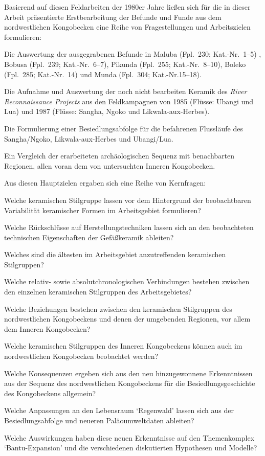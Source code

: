 \vspace{1.5em}
\noindent Basierend auf diesen Feldarbeiten der 1980er Jahre ließen sich für die in dieser Arbeit präsentierte Erstbearbeitung der Befunde und Funde aus dem nordwestlichen Kongobecken eine Reihe von Fragestellungen und Arbeitszielen formulieren:
\begin{itemize*}
\renewcommand\labelitemi{--}
\item Die Auswertung der ausgegrabenen Befunde in Maluba (Fpl.~230; Kat.-Nr.~1--5) , Bobusa (Fpl.~239; Kat.-Nr.~6--7), Pikunda (Fpl.~255; Kat.-Nr.~8--10), Boleko (Fpl.~285; Kat.-Nr.~14) und Munda (Fpl.~304; Kat.-Nr.15--18).
\item Die Aufnahme und Auswertung der noch nicht bearbeiten Keramik des \textit{River Reconnaissance Projects} aus den Feldkampagnen von 1985 (Flüsse: Ubangi und Lua) und 1987 (Flüsse: Sangha, Ngoko und Likwala-aux-Herbes).
\item Die Formulierung einer Besiedlungsabfolge für die befahrenen Flussläufe des Sangha/Ngoko, Likwala-aux-Herbes und Ubangi/Lua.
\item Ein Vergleich der erarbeiteten archäologischen Sequenz mit benachbarten Regionen, allen voran dem von \textcite{Wotzka.1995} untersuchten Inneren Kongobecken.
\end{itemize*}

\noindent Aus diesen Hauptzielen ergaben sich eine Reihe von Kernfragen:
\begin{itemize*}
\renewcommand\labelitemi{--}
\item Welche keramischen Stilgruppe lassen vor dem Hintergrund der beobachtbaren Variabilität keramischer Formen im Arbeitsgebiet formulieren?
\item Welche Rückschlüsse auf Herstellungstechniken lassen sich an den beobachteten technischen Eigenschaften der Gefäßkeramik ableiten?
\item Welches sind die ältesten im Arbeitsgebiet anzutreffenden keramischen Stilgruppen?
\item Welche relativ- sowie absolutchronologischen Verbindungen bestehen zwischen den einzelnen keramischen Stilgruppen des Arbeitsgebietes?
\item Welche Beziehungen bestehen zwischen den keramischen Stilgruppen des nordwestlichen Kongobeckens und denen der umgebenden Regionen, vor allem dem Inneren Kongobecken?
\item Welche keramischen Stilgruppen des Inneren Kongobeckens können auch im nordwestlichen Kongobecken beobachtet werden?
\item Welche Konsequenzen ergeben sich aus den neu hinzugewonnene Erkenntnissen aus der Sequenz des nordwestlichen Kongobeckens für die Besiedlungsgeschichte des Kongobeckens allgemein?
\item Welche Anpassungen an den Lebensraum \enquote*{Regenwald} lassen sich aus der Besiedlungsabfolge und neueren Paläoumweltdaten ableiten?
\item Welche Auswirkungen haben diese neuen Erkenntnisse auf den Themenkomplex \enquote*{Bantu-Expansion} und die verschiedenen diskutierten Hypothesen und Modelle?
\end{itemize*}

